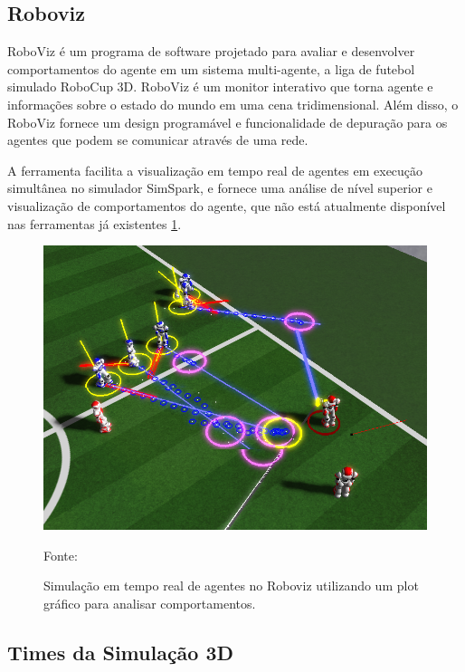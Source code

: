 \subsection{Roboviz}

RoboViz \cite{roboviz} é um programa de software projetado para avaliar e desenvolver comportamentos do agente em um sistema 
multi-agente, a liga de futebol simulado RoboCup 3D. RoboViz é um monitor interativo que torna agente e informações sobre o 
estado do mundo em uma cena tridimensional. Além disso, o RoboViz fornece um design programável e funcionalidade de depuração
para os agentes que podem se comunicar através de uma rede. 

A ferramenta facilita a visualização em tempo real de agentes em execução simultânea no simulador SimSpark, e fornece uma análise
de nível superior e visualização de comportamentos do agente, que não está atualmente disponível nas ferramentas já existentes 
\ref{fig:roboviz}.

\begin{figure}[h]

\centering

\includegraphics[scale=0.38]{figuras/roboviz.png}

\caption{Simulação em tempo real de agentes no Roboviz utilizando um plot gráfico para analisar comportamentos.} Fonte: \cite{robovizImg} \label{fig:roboviz}

\end{figure}
\FloatBarrier

\subsection{Times da Simulação 3D}

